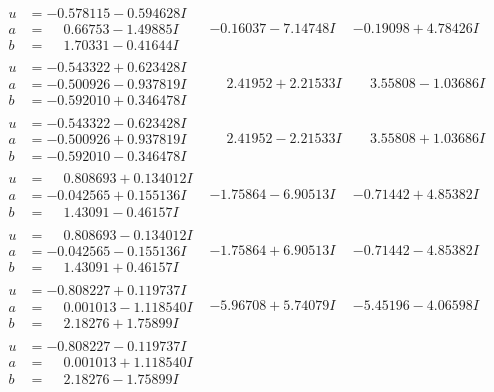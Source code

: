 \documentclass[1p]{elsarticle_modified}
\theoremstyle{definition}
\begin{document}
$$\begin{array}{c|c|c}
\begin{aligned}
u &= -0.578115 - 0.594628 I \\
a &= \phantom{-}0.66753 - 1.49885 I \\
b &= \phantom{-}1.70331 - 0.41644 I\end{aligned}
 & -0.16037 - 7.14748 I & -0.19098 + 4.78426 I \\ \hline\begin{aligned}
u &= -0.543322 + 0.623428 I \\
a &= -0.500926 - 0.937819 I \\
b &= -0.592010 + 0.346478 I\end{aligned}
 & \phantom{-}2.41952 + 2.21533 I & \phantom{-}3.55808 - 1.03686 I \\ \hline\begin{aligned}
u &= -0.543322 - 0.623428 I \\
a &= -0.500926 + 0.937819 I \\
b &= -0.592010 - 0.346478 I\end{aligned}
 & \phantom{-}2.41952 - 2.21533 I & \phantom{-}3.55808 + 1.03686 I \\ \hline\begin{aligned}
u &= \phantom{-}0.808693 + 0.134012 I \\
a &= -0.042565 + 0.155136 I \\
b &= \phantom{-}1.43091 - 0.46157 I\end{aligned}
 & -1.75864 - 6.90513 I & -0.71442 + 4.85382 I \\ \hline\begin{aligned}
u &= \phantom{-}0.808693 - 0.134012 I \\
a &= -0.042565 - 0.155136 I \\
b &= \phantom{-}1.43091 + 0.46157 I\end{aligned}
 & -1.75864 + 6.90513 I & -0.71442 - 4.85382 I \\ \hline\begin{aligned}
u &= -0.808227 + 0.119737 I \\
a &= \phantom{-}0.001013 - 1.118540 I \\
b &= \phantom{-}2.18276 + 1.75899 I\end{aligned}
 & -5.96708 + 5.74079 I & -5.45196 - 4.06598 I \\ \hline\begin{aligned}
u &= -0.808227 - 0.119737 I \\
a &= \phantom{-}0.001013 + 1.118540 I \\
b &= \phantom{-}2.18276 - 1.75899 I\end{aligned}

\end{array}$$
\end{document}
